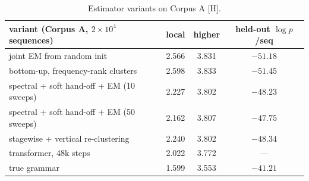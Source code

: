 \documentclass[11pt]{article}
\theoremstyle{definition}
\theoremstyle{remark}
\newcommand{\src}[1]{\textsf{\small[#1]}}
\begin{document}
\begin{table}[h]\centering\small
\begin{tabular}{lccc}
\toprule
variant (Corpus A, $2\times10^4$ sequences) & local & higher & held-out $\log p$/seq\\
\midrule
joint EM from random init & 2.566 & 3.831 & $-51.18$\\
bottom-up, frequency-rank clusters & 2.598 & 3.833 & $-51.45$\\
spectral + soft hand-off + EM (10 sweeps) & 2.227 & 3.802 & $-48.23$\\
spectral + soft hand-off + EM (50 sweeps) & 2.162 & 3.807 & $-47.75$\\
stagewise + vertical re-clustering & 2.240 & 3.802 & $-48.34$\\
\midrule
transformer, 48k steps & 2.022 & 3.772 & ---\\
true grammar & 1.599 & 3.553 & $-41.21$\\
\bottomrule
\end{tabular}
\caption{Estimator variants on Corpus A \src{H}.}
\end{table}
\end{document}
